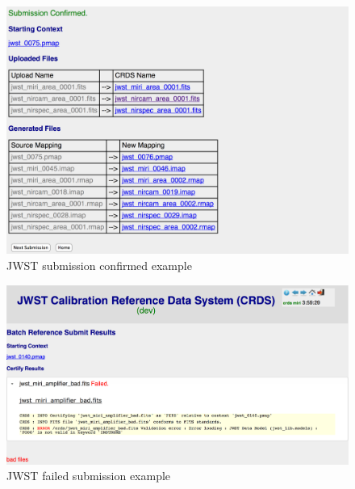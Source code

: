 \documentclass[final,authoryear,5p,times,twocolumn]{elsarticle}
\begin{document}
\begin{figure}[ht!]
\centering
\includegraphics[width=180mm]{JWST_Submission_Confirmed.png}
\caption{JWST submission confirmed example}
\label{fig:confirmedsubmission}
\end{figure}

\begin{figure}[ht!]
\centering
\includegraphics[width=180mm]{JWST_Failed_Submission_DM_schema_violation.png}
\caption{JWST failed submission example\newline\newline}
\label{fig:failedsubmission}
\end{figure}
\end{document}
